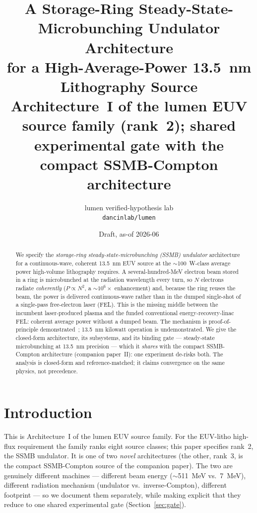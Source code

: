 \documentclass[11pt,a4paper]{article}
\title{\textbf{A Storage-Ring Steady-State-Microbunching Undulator Architecture\\
for a High-Average-Power \SI{13.5}{\nano\meter} Lithography Source}\\[4pt]
\large Architecture~I of the lumen EUV source family (rank~2); shared experimental gate with the
compact SSMB-Compton architecture}
\author{lumen verified-hypothesis lab \\ \texttt{dancinlab/lumen}}
\date{Draft, as-of 2026-06}
\begin{document}
\maketitle

\begin{abstract}
We specify the \emph{storage-ring steady-state-microbunching (SSMB) undulator} architecture for a
continuous-wave, coherent \SI{13.5}{\nano\meter} EUV source at the $\sim$\SI{100}{\watt}-class
average power high-volume lithography requires. A several-hundred-MeV electron beam stored in a ring
is microbunched at the radiation wavelength every turn, so $N$ electrons radiate \emph{coherently}
($P\!\propto\!N^{2}$, a $\sim\!10^{6}\times$ enhancement) and, because the ring reuses the beam, the
power is delivered continuous-wave rather than in the dumped single-shot of a single-pass
free-electron laser (FEL). This is the missing middle between the incumbent laser-produced plasma and
the funded conventional energy-recovery-linac FEL: coherent average power without a dumped beam.
The mechanism is proof-of-principle demonstrated~\citep{deng2021}; \SI{13.5}{\nano\meter} kilowatt
operation is undemonstrated. We give the closed-form architecture, its subsystems, and its binding
gate --- steady-state microbunching at \SI{13.5}{\nano\meter} precision --- which it \emph{shares}
with the compact SSMB-Compton architecture (companion paper~II): one experiment de-risks both. The
analysis is closed-form and reference-matched; it claims convergence on the same physics, not
precedence.
\end{abstract}

\section{Introduction}
This is Architecture~I of the lumen EUV source family. For the EUV-litho high-flux requirement the
family ranks eight source classes; this paper specifies rank~2, the SSMB undulator. It is one of two
\emph{novel} architectures (the other, rank~3, is the compact SSMB-Compton source of the companion
paper). The two are genuinely different machines --- different beam energy ($\sim$\SI{511}{\mega\electronvolt}
vs.\ \SI{7}{\mega\electronvolt}), different radiation mechanism (undulator vs.\ inverse-Compton),
different footprint --- so we document them separately, while making explicit that they reduce to one
shared experimental gate (Section~\ref{sec:gate}).
\end{document}
